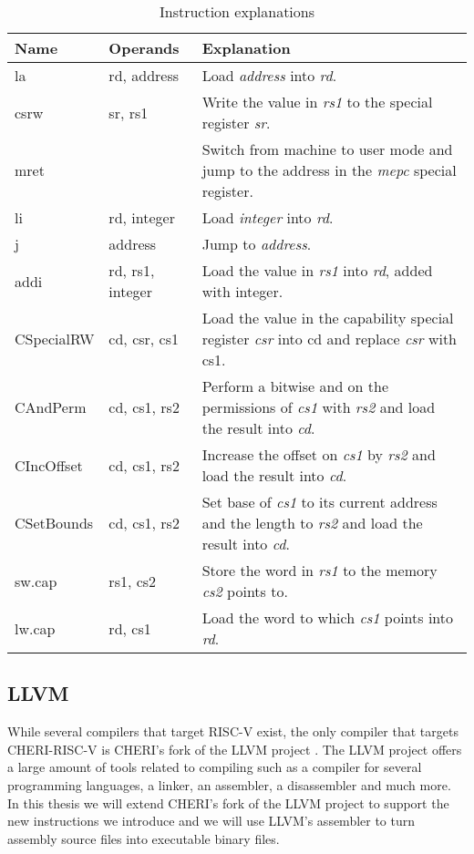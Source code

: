 \begin{table}[ht]
\centering
\begin{tabular}{|l|l|p{8cm}|}
\hline
Name & Operands & Explanation \\
\hline
la & rd, address & Load \textit{address} into \textit{rd}. \\
csrw & sr, rs1 & Write the value in \textit{rs1} to the special register \textit{sr}. \\
mret & & Switch from machine to user mode and jump to the address in the \textit{mepc} special register.\\
li & rd, integer & Load \textit{integer} into \textit{rd}. \\
j & address & Jump to \textit{address}. \\
addi & rd, rs1, integer & Load the value in \textit{rs1} into \textit{rd}, added with {integer}. \\
\hline
CSpecialRW & cd, csr, cs1 & Load the value in the capability special register \textit{csr} into {cd} and replace \textit{csr} with {cs1}. \\
CAndPerm & cd, cs1, rs2 & Perform a bitwise and on the permissions of \textit{cs1} with \textit{rs2} and load the result into \textit{cd}. \\
CIncOffset & cd, cs1, rs2 & Increase the offset on \textit{cs1} by \textit{rs2} and load the result into \textit{cd}. \\
CSetBounds & cd, cs1, rs2 & Set base of \textit{cs1} to its current address and the length to \textit{rs2} and load the result into \textit{cd}. \\
sw.cap & rs1, cs2 & Store the word in \textit{rs1} to the memory \textit{cs2} points to. \\
lw.cap & rd, cs1 & Load the word to which \textit{cs1} points into \textit{rd}. \\
\hline
\end{tabular}
\caption{Instruction explanations}
\label{table:riscvinsts}
\end{table}

\subsection{LLVM}
\label{sec:llvm_background}
While several compilers that target RISC-V exist, the only compiler that targets CHERI-RISC-V is CHERI's fork of the LLVM project \cite{cherillvm}.
The LLVM project offers a large amount of tools related to compiling such as a compiler for several programming languages, a linker, an assembler, a disassembler and much more.
In this thesis we will extend CHERI's fork of the LLVM project to support the new instructions we introduce and we will use LLVM's assembler to turn assembly source files into executable binary files.


